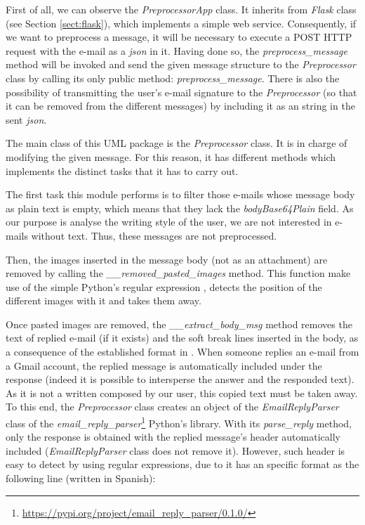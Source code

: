 First of all, we can observe the \textit{PreprocessorApp} class. It inherits from \textit{Flask} class (see Section \ref{sect:flask}), which implements a simple web service. Consequently, if we want to preprocess a message, it will be necessary to execute a POST HTTP request with the e-mail as a \textit{json} in it. Having done so, the \textit{preprocess\_message} method will be invoked and send the given message structure to the \textit{Preprocessor} class by calling its only public method: \textit{preprocess\_message}. There is also the possibility of transmitting the user's e-mail signature to the \textit{Preprocessor} (so that it can be removed from the different messages) by including it as an string in the sent \textit{json}.

The main class of this UML package is the \textit{Preprocessor} class. It is in charge of modifying the given message. For this reason, it has different methods which implements the distinct tasks that it has to carry out.

The first task this module performs is to filter those e-mails whose message body as plain text is empty, which means that they lack the \textit{bodyBase64Plain} field. As our purpose is analyse the writing style of the user, we are not interested in e-mails without text. Thus, these messages are not preprocessed.

Then, the images inserted in the message body (not as an attachment) are removed by calling the \textit{\_\_removed\_pasted\_images} method. This function make use of the simple Python's regular expression \pythoninline{r'\\[image:[\^\\]]+\\]'}, detects the position of the different images with it and takes them away.

Once pasted images are removed, the \textit{\_\_extract\_body\_msg} method removes the text of replied e-mail (if it exists) and the soft break lines inserted in the body, as a consequence of the established format in \cite{rfc2646}. When someone replies an e-mail from a Gmail account, the replied message is automatically included under the response (indeed it is possible to intersperse the answer and the responded text). As it is not a written composed by our user, this copied text must be taken away. To this end, the \textit{Preprocessor} class creates an object of the \textit{EmailReplyParser} class of the \textit{email\_reply\_parser}\footnote{\url{https://pypi.org/project/email_reply_parser/0.1.0/}} Python's library. With its \textit{parse\_reply} method, only the response is obtained with the replied message's header automatically included (\textit{EmailReplyParser} class does not remove it). However, such header is easy to detect by using regular expressions, due to it has an specific format as the following line (written in Spanish):

